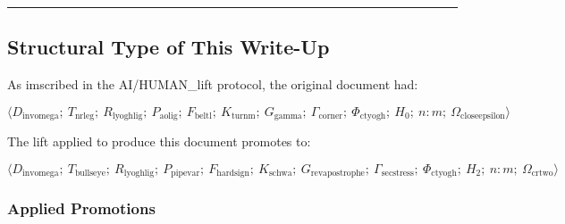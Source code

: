 \documentclass[12pt,a4paper]{article}
\begin{document}
\begin{center}
\rule{0.5\textwidth}{0.4pt}
\end{center}

\subsection{Structural Type of This Write-Up}

As imscribed in the AI/HUMAN\_lift protocol, the original document had:

\[\langle D_{\text{invomega}};\ T_{\text{nrleg}};\ R_{\text{lyoghlig}};\ P_{\text{aolig}};\ F_{\text{beltl}};\ K_{\text{turnm}};\ G_{\text{gamma}};\ \Gamma_{\text{corner}};\ \Phi_{\text{ctyogh}};\ H_0;\ n{:}m;\ \Omega_{\text{closeepsilon}} \rangle\]

The lift applied to produce this document promotes to:

\[\langle D_{\text{invomega}};\ T_{\text{bullseye}};\ R_{\text{lyoghlig}};\ P_{\text{pipevar}};\ F_{\text{hardsign}};\ K_{\text{schwa}};\ G_{\text{revapostrophe}};\ \Gamma_{\text{secstress}};\ \Phi_{\text{ctyogh}};\ H_2;\ n{:}m;\ \Omega_{\text{crtwo}} \rangle\]

\subsubsection{Applied Promotions}
\end{document}
